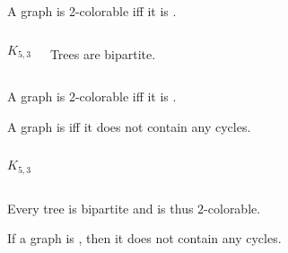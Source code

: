 \begin{frame}{}
  \begin{theorem}
    A graph is 2-colorable iff \pause it is .
  \end{theorem}

  \vspace{0.80cm}
  \begin{columns}
      \pause
      \[
        K_{5, 3}
      \]
      \pause
      \begin{center}
        Trees are bipartite.
      \end{center}
  \end{columns}
\end{frame}

\begin{frame}{}
  \begin{theorem}
    A graph is 2-colorable iff it is .

    \pause
    \vspace{0.30cm}
    A graph is  iff it does not contain any  cycles.
  \end{theorem}

  \begin{columns}
      \pause
      \[
        K_{5, 3}
      \]
      \pause
  \end{columns}

  \pause
  \begin{lemma}
    Every tree is bipartite and is thus $2$-colorable.
  \end{lemma}
\end{frame}

\begin{frame}{}
  \begin{Lemma}
    If a graph is ,
    then it does not contain any  cycles.
  \end{Lemma}

  \vspace{0.80cm}
\end{frame}

